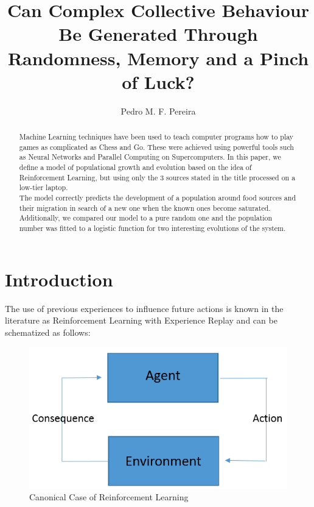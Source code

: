 \documentclass[a4paper,prd,twocolumn,nofootinbib,superscriptaddress,floatfix]{revtex4}
\begin{document}

\title{Can Complex Collective Behaviour Be Generated Through Randomness, Memory and a Pinch of Luck?}

\author{Pedro M. F. Pereira}





\begin{abstract}
Machine Learning techniques have been used to teach computer programs how to play games as complicated as Chess and Go. These were achieved using powerful tools such as Neural Networks and Parallel Computing on Supercomputers. In this paper, we define a model of populational growth and evolution based on the idea of Reinforcement Learning, but using only the 3 sources stated in the title processed on a low-tier laptop.\\
The model correctly predicts the development of a population around food sources and their migration in search of a new one when the known ones become saturated. Additionally, we compared our model to a pure random one and the population number was fitted to a logistic function for two interesting evolutions of the system.
\end{abstract}

\maketitle

\section{Introduction}

The use of previous experiences to influence future actions is known in the literature as Reinforcement Learning with Experience Replay \cite{reinforcementlearning} and can be schematized as follows:\\
\begin{figure}[H]
\centering
  \includegraphics[scale=0.3]{scheme.png}
\caption{Canonical Case of Reinforcement Learning}
  \label{fig:1}
\end{figure}
\end{document}
